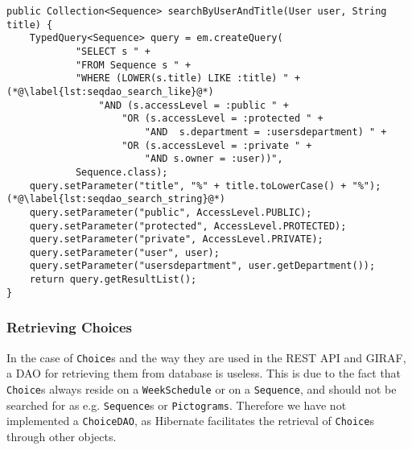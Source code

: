 \begin{lstlisting}[float, floatplacement=h, caption={The method in \texttt{SequenceDaoImpl} which allows for \texttt{Sequence}s to be searched for by title}, label={lst:seqdao_search}]
public Collection<Sequence> searchByUserAndTitle(User user, String title) {
    TypedQuery<Sequence> query = em.createQuery(
            "SELECT s " +
            "FROM Sequence s " +
            "WHERE (LOWER(s.title) LIKE :title) " +(*@\label{lst:seqdao_search_like}@*)
                "AND (s.accessLevel = :public " +
                    "OR (s.accessLevel = :protected " +
                        "AND  s.department = :usersdepartment) " +
                    "OR (s.accessLevel = :private " +
                        "AND s.owner = :user))",
            Sequence.class);
    query.setParameter("title", "%" + title.toLowerCase() + "%");(*@\label{lst:seqdao_search_string}@*)
    query.setParameter("public", AccessLevel.PUBLIC);
    query.setParameter("protected", AccessLevel.PROTECTED);
    query.setParameter("private", AccessLevel.PRIVATE);
    query.setParameter("user", user);
    query.setParameter("usersdepartment", user.getDepartment());
    return query.getResultList();
}
\end{lstlisting}

\subsubsection{Retrieving Choices}
In the case of \texttt{Choice}s and the way they are used in the REST API and GIRAF, a DAO for retrieving them from database is useless.
This is due to the fact that \texttt{Choice}s always reside on a \texttt{WeekSchedule} or on a \texttt{Sequence}, and should not be searched for as e.g. \texttt{Sequence}s or \texttt{Pictograms}.
Therefore we have not implemented a \texttt{ChoiceDAO}, as Hibernate facilitates the retrieval of \texttt{Choice}s through other objects.
